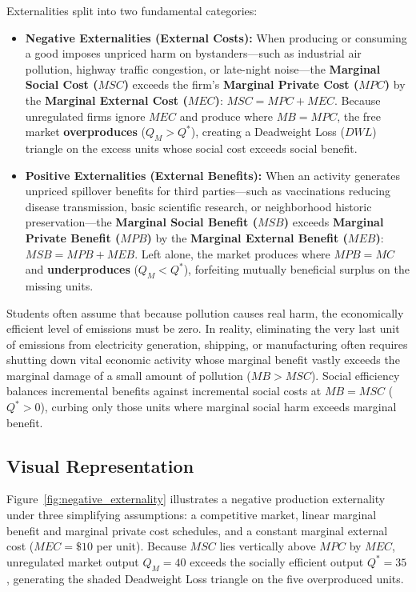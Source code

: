 \documentclass[11pt,letterpaper]{article}
\begin{document}
Externalities split into two fundamental categories:
\begin{itemize}
    \item \textbf{Negative Externalities (External Costs):} When producing or consuming a good imposes unpriced harm on bystanders—such as industrial air pollution, highway traffic congestion, or late-night noise—the \textbf{Marginal Social Cost ($MSC$)} exceeds the firm's \textbf{Marginal Private Cost ($MPC$)} by the \textbf{Marginal External Cost ($MEC$)}: $MSC = MPC + MEC$. Because unregulated firms ignore $MEC$ and produce where $MB = MPC$, the free market \textbf{overproduces} ($Q_M > Q^*$), creating a Deadweight Loss ($DWL$) triangle on the excess units whose social cost exceeds social benefit.
    \item \textbf{Positive Externalities (External Benefits):} When an activity generates unpriced spillover benefits for third parties—such as vaccinations reducing disease transmission, basic scientific research, or neighborhood historic preservation—the \textbf{Marginal Social Benefit ($MSB$)} exceeds \textbf{Marginal Private Benefit ($MPB$)} by the \textbf{Marginal External Benefit ($MEB$)}: $MSB = MPB + MEB$. Left alone, the market produces where $MPB = MC$ and \textbf{underproduces} ($Q_M < Q^*$), forfeiting mutually beneficial surplus on the missing units.
\end{itemize}

\begin{tcolorbox}[colback=CourseAmber!10!white,colframe=CourseOrange!85!black,title=\textbf{Clear It Up: Why the Socially Optimal Level of Pollution Is Rarely Zero}]
Students often assume that because pollution causes real harm, the economically efficient level of emissions must be zero. In reality, eliminating the very last unit of emissions from electricity generation, shipping, or manufacturing often requires shutting down vital economic activity whose marginal benefit vastly exceeds the marginal damage of a small amount of pollution ($MB > MSC$). Social efficiency balances incremental benefits against incremental social costs at $MB = MSC$ ($Q^* > 0$), curbing only those units where marginal social harm exceeds marginal benefit.
\end{tcolorbox}

\subsection*{Visual Representation}
Figure~\ref{fig:negative_externality} illustrates a negative production externality under three simplifying assumptions: a competitive market, linear marginal benefit and marginal private cost schedules, and a constant marginal external cost ($MEC = \$10$ per unit). Because $MSC$ lies vertically above $MPC$ by $MEC$, unregulated market output $Q_M = 40$ exceeds the socially efficient output $Q^* = 35$, generating the shaded Deadweight Loss triangle on the five overproduced units.
\end{document}
